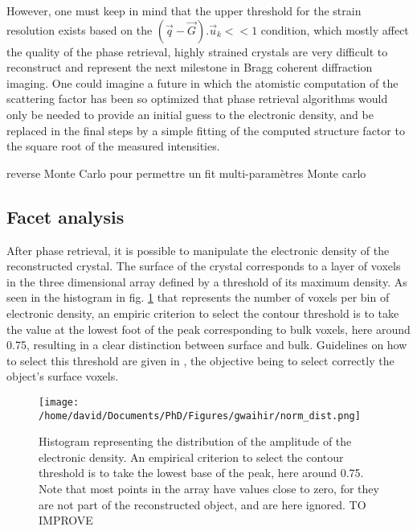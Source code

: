 However, one must keep in mind that the upper threshold for the strain resolution exists based on the $(\vec{q}-\vec{G}).\vec{u}_k<<1$ condition, which mostly affect the quality of the phase retrieval, highly strained crystals are very difficult to reconstruct and represent the next milestone in Bragg coherent diffraction imaging.
One could imagine a future in which the atomistic computation of the scattering factor has been so optimized that phase retrieval algorithms would only be needed to provide an initial guess to the electronic density, and be replaced in the final steps by a simple fitting of the computed structure factor to the square root of the measured intensities.

 reverse Monte Carlo pour permettre un fit multi-paramètres
 Monte carlo \parencite{RLMcGreevy_2001}

\subsection{Facet analysis} \label{sec:FacetAnalysis}

After phase retrieval, it is possible to manipulate the electronic density of the reconstructed crystal.
The surface of the crystal corresponds to a layer of voxels in the three dimensional array defined by a threshold of its maximum density.
As seen in the histogram in fig. \ref{fig:histo} that represents the number of voxels per bin of electronic density, an empiric criterion to select the contour threshold is to take the value at the lowest foot of the peak corresponding to bulk voxels, here around \num{0.75}, resulting in a clear distinction between surface and bulk.
Guidelines on how to select this threshold are given in \cite{Carnis2019_scientific_reports}, the objective being to select correctly the object's surface voxels.

\begin{figure}[!htb]
   \centering
   \texttt{[image: /home/david/Documents/PhD/Figures/gwaihir/norm\_dist.png]}
   \caption{Histogram representing the distribution of the amplitude of the electronic density.
   An empirical criterion to select the contour threshold is to take the lowest base of the peak, here around 0.75.
   Note that most points in the array have values close to zero, for they are not part of the reconstructed object, and are here ignored. TO IMPROVE
   }
   \label{fig:histo}
\end{figure}


